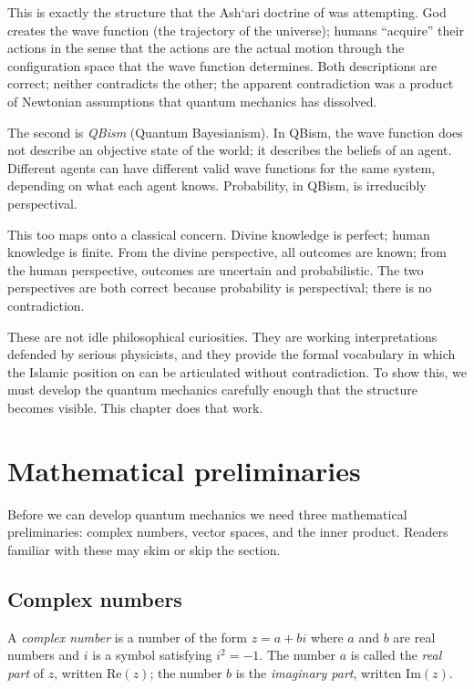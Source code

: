 This is exactly the structure that the Ash`ari doctrine of
 was attempting. God creates the wave function (the
trajectory of the universe); humans ``acquire'' their actions in the
sense that the actions are the actual motion through the
configuration space that the wave function determines. Both
descriptions are correct; neither contradicts the other; the
apparent contradiction was a product of Newtonian assumptions that
quantum mechanics has dissolved.

The second is \emph{QBism} (Quantum Bayesianism). In QBism, the wave
function does not describe an objective state of the world; it
describes the beliefs of an agent. Different agents can have
different valid wave functions for the same system, depending on
what each agent knows. Probability, in QBism, is irreducibly
perspectival.

This too maps onto a classical  concern. Divine knowledge
is perfect; human knowledge is finite. From the divine perspective,
all outcomes are known; from the human perspective, outcomes are
uncertain and probabilistic. The two perspectives are both correct
because probability is perspectival; there is no contradiction.

These are not idle philosophical curiosities. They are working
interpretations defended by serious physicists, and they provide the
formal vocabulary in which the Islamic position on  can
be articulated without contradiction. To show this, we must develop
the quantum mechanics carefully enough that the structure becomes
visible. This chapter does that work.

\section{Mathematical preliminaries}
\label{sec:complex-vectors}

Before we can develop quantum mechanics we need three mathematical
preliminaries: complex numbers, vector spaces, and the inner
product. Readers familiar with these may skim or skip the section.

\subsection{Complex numbers}

A \emph{complex number} is a number of the form $z = a + bi$ where
$a$ and $b$ are real numbers and $i$ is a symbol satisfying $i^2 =
-1$. The number $a$ is called the \emph{real part} of $z$, written
$\text{Re}(z)$; the number $b$ is the \emph{imaginary part},
written $\text{Im}(z)$.

